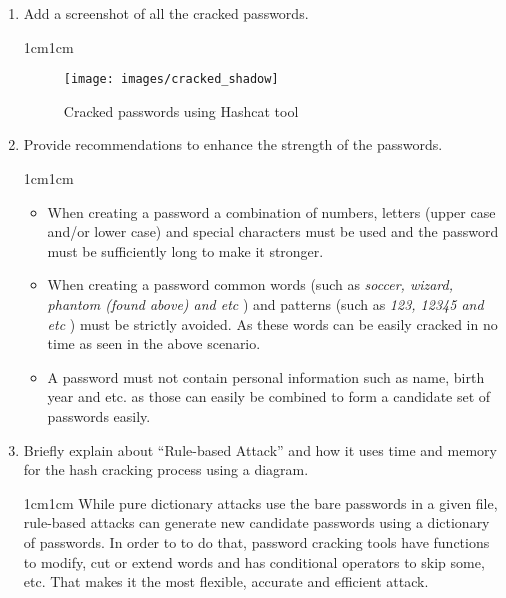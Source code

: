 \documentclass[11pt,letterpaper]{article}
\newenvironment{answer}{\em \color{blue} \begin{adjustwidth}{1cm}{1cm}}{\end{adjustwidth}}
\begin{document}
\begin{enumerate}
\begin{answer}
			
		\end{answer}
		
		\item Add a screenshot of all the cracked passwords.
		
		\begin{answer}
			\begin{figure}[h]
				\centering
				\texttt{[image: images/cracked\_shadow]}
				\caption{Cracked passwords using Hashcat tool} \label{fig:cracked_shadow}
			\end{figure}
		\end{answer}
		
		\item Provide recommendations to enhance the strength of the passwords.
		
		\begin{answer}
		\begin{itemize}
			\item When creating a password a combination of numbers, letters (upper case and/or lower case)  and special characters must be used and the password must be sufficiently long to make it stronger.				
			
			\item When creating a password common words (such as \textit{soccer, wizard, phantom (found above)  and etc} ) and patterns (such as \textit{123, 12345 and etc} ) must be strictly avoided. As these words can be easily cracked in no time as seen in the above scenario.					
			
			\item A password must not contain personal information such as name, birth year and etc. as those can easily be combined to form a candidate set of passwords easily.
		\end{itemize}
		\end{answer}
		
		\item Briefly explain about ``Rule-based Attack'' and how it uses time and memory for the hash cracking process using a diagram.
		
		\begin{answer}
			While pure dictionary attacks use the bare passwords in a given file, rule-based attacks can generate new candidate passwords using a dictionary of passwords. In order to to do that, password cracking tools have functions to modify, cut or extend words and has conditional operators to skip some, etc. That makes it the most flexible, accurate and efficient attack.
		\end{answer}
		

\end{enumerate}
\end{document}
